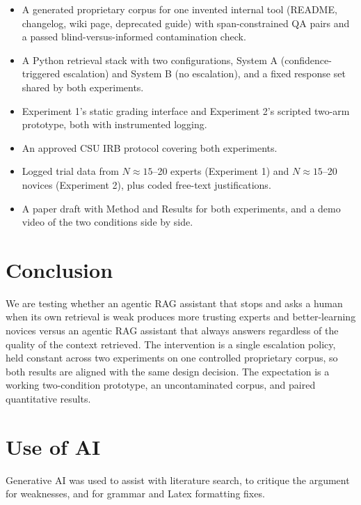 \documentclass[sigconf,nonacm]{acmart}
\begin{document}
\begin{itemize}
  \item A generated proprietary corpus for one invented internal tool
  (README, changelog, wiki page, deprecated guide) with span-constrained
  QA pairs and a passed blind-versus-informed contamination check.
  \item A Python retrieval stack with two configurations, System A
  (confidence-triggered escalation) and System B
  (no escalation), and a fixed response set shared by both experiments.
  \item Experiment 1's static grading interface and Experiment 2's
  scripted two-arm prototype, both with instrumented logging.
  \item An approved CSU IRB protocol covering both experiments.
  \item Logged trial data from $N \approx 15$--20 experts (Experiment 1)
  and $N \approx 15$--20 novices (Experiment 2), plus coded free-text
  justifications.
  \item A paper draft with Method and Results for both experiments, and a
  demo video of the two conditions side by side.
\end{itemize}

\section{Conclusion}

We are testing whether an agentic RAG assistant that stops and asks a human
when its own retrieval is weak produces more trusting experts and
better-learning novices versus an agentic RAG assistant that always answers regardless of the quality of the context retrieved. The intervention is a single escalation policy, held constant across two experiments on one controlled proprietary corpus, so both results are aligned with the same design decision. The expectation is a working two-condition prototype, an
uncontaminated corpus, and paired quantitative results.

\section*{Use of AI}

Generative AI was used to assist with literature search, to critique the argument for weaknesses, and for grammar and Latex formatting fixes. 



\end{document}
